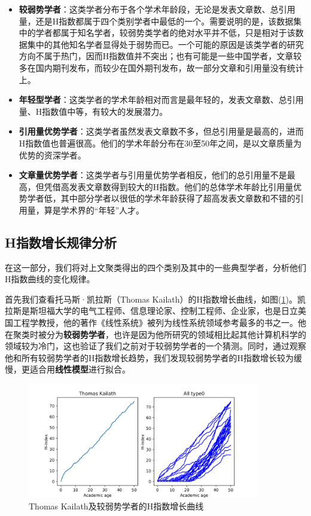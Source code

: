 \documentclass[lang=cn,11pt,a4paper,cite=authoryear]{elegantpaper}
\begin{document}
\begin{itemize}
	\item \textbf{较弱势学者}：这类学者分布于各个学术年龄段，无论是发表文章数、总引用量，还是H指数都属于四个类别学者中最低的一个。需要说明的是，该数据集中的学者都属于知名学者，较弱势类学者的绝对水平并不低，只是相对于该数据集中的其他知名学者显得处于弱势而已。一个可能的原因是该类学者的研究方向不属于热门，因而H指数值并不突出；也有可能是一些中国学者，文章较多在国内期刊发布，而较少在国外期刊发布，故一部分文章和引用量没有统计上。
	\item \textbf{年轻型学者}：这类学者的学术年龄相对而言是最年轻的，发表文章数、总引用量、H指数值中等，有较大的发展潜力。
	\item \textbf{引用量优势学者}：这类学者虽然发表文章数不多，但总引用量是最高的，进而H指数值也普遍很高。他们的学术年龄分布在30至50年之间，是以文章质量为优势的资深学者。
	\item \textbf{文章量优势学者}：这类学者与引用量优势学者相反，他们的总引用量不是最高，但凭借高发表文章数得到较大的H指数。他们的总体学术年龄比引用量优势学者低，其中部分学者以很低的学术年龄获得了超高发表文章数和不错的引用量，算是学术界的“年轻”人才。
\end{itemize}

\subsection{H指数增长规律分析}

在这一部分，我们将对上文聚类得出的四个类别及其中的一些典型学者，分析他们H指数曲线的变化规律。

首先我们查看托马斯·凯拉斯（Thomas Kailath）的H指数增长曲线，如图(\ref{fig3})。凯拉斯是斯坦福大学的电气工程师、信息理论家、控制工程师、企业家，也是日立美国工程学教授，他的著作《线性系统》被列为线性系统领域参考最多的书之一。他在聚类时被分为\textbf{较弱势学者}，也许是因为他所研究的领域相比起其他计算机科学的领域较为冷门，这也验证了我们之前对于较弱势学者的一个猜测。同时，通过观察他和所有较弱势学者的H指数增长趋势，我们发现较弱势学者的H指数增长较为缓慢，更适合用\textbf{线性模型}进行拟合。

\begin{figure}[H]
	\centering
	\includegraphics[width=0.9\textwidth]{image/Thomas Kailath.png}
	\caption{Thomas Kailath及较弱势学者的H指数增长曲线}
	\label{fig3}
\end{figure}
\end{document}
